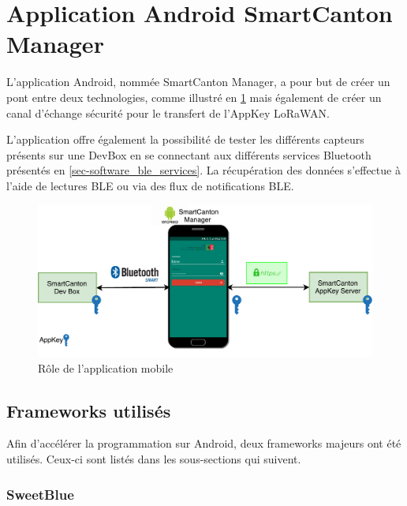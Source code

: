 
\FloatBarrier
\newpage
\section{Application Android SmartCanton Manager}
\label{sec-soft_android}


L'application Android, nommée SmartCanton Manager, a pour but de créer un pont entre deux technologies, comme illustré en \cref{fig-diagram_android_architecture} mais également de créer un canal d'échange sécurité pour le transfert de l'AppKey LoRaWAN. 

L'application offre également la possibilité de tester les différents capteurs présents sur une DevBox en se connectant aux différents services Bluetooth présentés en \cref{sec-software_ble_services}. La récupération des données s'effectue à l'aide de lectures BLE ou via des flux de notifications BLE.

\begin{figure}[ht!]
    \centering
    \includegraphics[width=1.0\textwidth]{Figures/Software/diagram_android_architecture.pdf}
    \caption{Rôle de l'application mobile}
    \label{fig-diagram_android_architecture}
\end{figure}


\subsection{Frameworks utilisés}

Afin d'accélérer la programmation sur Android, deux frameworks majeurs ont été utilisés. Ceux-ci sont listés dans les sous-sections qui suivent.

\subsubsection{SweetBlue}

